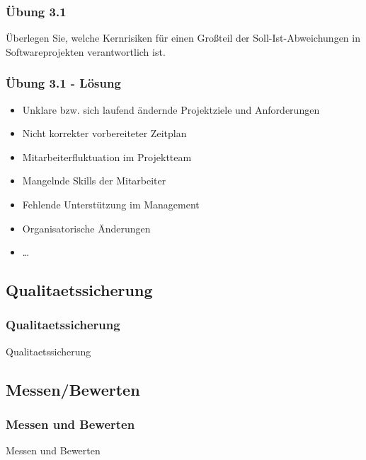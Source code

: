 \begin{frame}
\frametitle{Übung 3.1}
	Überlegen Sie, welche Kernrisiken für einen Großteil der Soll-Ist-Abweichungen
	in Softwareprojekten verantwortlich ist.
\end{frame}

\ifloesung
\begin{frame}
\frametitle{Übung 3.1 - Lösung}
	\begin{itemize}
		\item Unklare bzw. sich laufend ändernde Projektziele und Anforderungen
		\item Nicht korrekter vorbereiteter Zeitplan
		\item Mitarbeiterfluktuation im Projektteam
		\item Mangelnde Skills der Mitarbeiter
		\item Fehlende Unterstützung im Management
		\item Organisatorische Änderungen
		\item \ldots
	\end{itemize}
\end{frame}

\subsection{Qualitaetssicherung}
\begin{frame}
\frametitle{Qualitaetssicherung}
\huge Qualitaetssicherung
\end{frame}

\subsection{Messen/Bewerten}
\begin{frame}
\frametitle{Messen und Bewerten}
\huge Messen und Bewerten
\end{frame}
